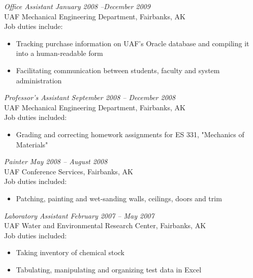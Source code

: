 \documentclass[10pt, letterpaper]{article}
\begin{document}
\large\textit{Office Assistant \hfill January 2008 --December 2009}\normalsize \\
UAF Mechanical Engineering Department, Fairbanks, AK\\
Job duties include:
\small\begin{itemize}
\item Tracking purchase information on UAF's Oracle database and compiling it
into a human-readable form
\item Facilitating communication between students, faculty and system
administration
\end{itemize}\normalsize\medskip

\large\textit{Professor's Assistant	\hfill September 2008 -- December 2008}\normalsize \\
UAF Mechanical Engineering Department, Fairbanks, AK\\
Job duties included:
\small\begin{itemize}
\item Grading and correcting homework assignments for ES 331, "Mechanics of Materials"
\end{itemize}\normalsize\medskip

\large\textit{Painter	\hfill May 2008 -- August 2008}\normalsize\\
UAF Conference Services, Fairbanks, AK\\
Job duties included:
\small\begin{itemize}
\item Patching, painting and wet-sanding walls, ceilings, doors and trim
\end{itemize}\normalsize\medskip


\large\textit{Laboratory Assistant \hfill February 2007 -- May 2007}\normalsize \\
UAF Water and Environmental Research Center, Fairbanks, AK\\
Job duties included:
\small\begin{itemize}
\item Taking inventory of chemical stock
\item Tabulating, manipulating and organizing test data in Excel
\end{itemize}\normalsize\medskip
\end{document}
